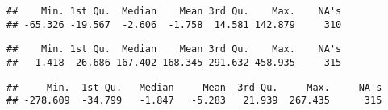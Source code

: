 \documentclass[]{article}
\newenvironment{Shaded}{\begin{snugshade}}{\end{snugshade}}
\newcommand{\KeywordTok}[1]{\textcolor[rgb]{0.13,0.29,0.53}{\textbf{#1}}}
\newcommand{\DecValTok}[1]{\textcolor[rgb]{0.00,0.00,0.81}{#1}}
\newcommand{\StringTok}[1]{\textcolor[rgb]{0.31,0.60,0.02}{#1}}
\newcommand{\OperatorTok}[1]{\textcolor[rgb]{0.81,0.36,0.00}{\textbf{#1}}}
\newcommand{\NormalTok}[1]{#1}
\begin{document}
\begin{Shaded}
\end{Shaded}

\begin{verbatim}
##    Min. 1st Qu.  Median    Mean 3rd Qu.    Max.    NA's 
## -65.326 -19.567  -2.606  -1.758  14.581 142.879     310
\end{verbatim}

\begin{Shaded}
\end{Shaded}

\begin{verbatim}
##    Min. 1st Qu.  Median    Mean 3rd Qu.    Max.    NA's 
##   1.418  26.686 167.402 168.345 291.632 458.935     315
\end{verbatim}

\begin{Shaded}
\end{Shaded}

\begin{verbatim}
##     Min.  1st Qu.   Median     Mean  3rd Qu.     Max.     NA's 
## -278.609  -34.799   -1.847   -5.283   21.939  267.435      315
\end{verbatim}

\begin{Shaded}
\end{Shaded}
\end{document}
